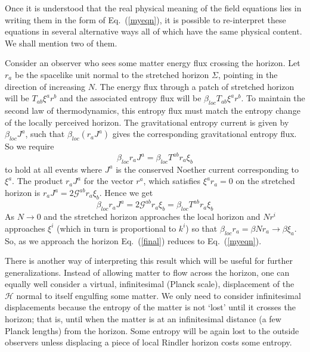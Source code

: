 \documentclass[12pt]{iopart}
\def\eq#1{{Eq.~(\ref{#1})}}
\begin{document}
 Once it is understood that the real physical meaning of the field equations
 lies in writing them in the form of \eq{myeqn}, it is possible to re-interpret
 these equations in several alternative ways all of which have the same physical content.
 We shall mention two of them. 
 
 Consider an observer who sees 
 some matter energy flux crossing the  horizon.   Let $r_a$ be the spacelike unit normal to the stretched horizon $\Sigma$, pointing in the direction of increasing $ N$.   The energy flux through a
 patch of stretched horizon  will be $T_{ab}\xi^ar^b$ and the associated entropy flux will be $\beta_{loc} T_{ab}\xi^ar^b$.
 To maintain the second law of thermodynamics, this entropy flux must match  the entropy change of the locally perceived  horizon.
 The gravitational entropy current is given by  $\beta_{loc}J^a$, such that
 $\beta_{loc}(r_aJ^a)$  gives the corresponding  gravitational entropy flux.  So we require
  \begin{equation}
\beta_{loc} r_a J^a =\beta_{loc} T^{a b} r_a \xi_b
\label{crucial1}
\end{equation}  
 to hold at 
 all events where  $J^a$ is the conserved Noether current corresponding to $\xi^a$.
 The product $r_a J^a$ for the vector $r^a$, which satisfies $\xi^ar_a=0$ on the stretched horizon is
$
r_a J^a = 2 \mathcal{G}^{a b} r_a \xi_b $.
 Hence we get
\begin{equation}
\beta_{loc} r_a J^a =2 \mathcal{G}^{a b} r_a \xi_b=\beta_{loc} T^{a b} r_a \xi_b
\label{final}
\end{equation}
As $ N\to0$ and the stretched horizon approaches the local horizon and $ N r^i$ approaches $\xi^i$ (which in turn is proportional to $k^i$) so that $\beta_{loc}r_a=\beta N r_a\to\beta\xi_a$. So, 
 as we approach the horizon \eq{final} reduces to \eq{myeqn}. 
 
There is another way of interpreting this result which will be useful for further generalizations. Instead of allowing  matter to flow  across the horizon, one can equally well
  consider a  virtual, infinitesimal (Planck scale), displacement of the $\mathcal{H}$ normal to itself
engulfing some matter. We only need to consider infinitesimal displacements because the entropy of the matter is not `lost' until it crosses the horizon; that is, until when the matter is at an infinitesimal distance (a few Planck lengths) from the horizon. 
 Some entropy will be again lost to the  outside observers unless  displacing a piece of local Rindler horizon  costs some entropy. 
 
\end{document}
